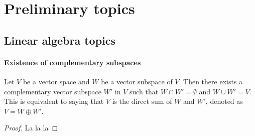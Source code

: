 \section{Preliminary topics}

\subsection{Linear algebra topics}

\paragraph{Existence of complementary subspaces}

\begin{corollary}\label{thm:compsubspaces}
	Let $V$ be a vector space and $W$ be a vector subspace of $V$. Then there exists a complementary vector subspace $W'$ in $V$ such that $W \cap W' = \emptyset$ and $W \cup W' = V$. This is equivalent to saying that $V$ is the direct sum of $W$ and $W'$, denoted as $V = W \oplus W'$.
\end{corollary}
\begin{proof}
	La la la
\end{proof}